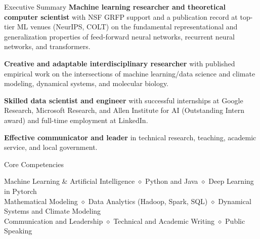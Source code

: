 \documentclass{resume} %
\begin{document}

\begin{rSection}{Executive Summary}
\textbf{Machine learning researcher and theoretical computer scientist} with NSF GRFP support and a publication record at top-tier ML venues (NeurIPS, COLT)  on the fundamental representational and generalization properties of feed-forward neural networks, recurrent neural networks, and transformers.

\textbf{Creative and adaptable interdisciplinary researcher} with published empirical work on the intersections of machine learning/data science and climate modeling, dynamical systems, and molecular biology.

\textbf{Skilled data scientist and engineer} with successful internships at Google Research, Microsoft Research, and Allen Institute for AI (Outstanding Intern award) and full-time employment at LinkedIn. 

\textbf{Effective communicator and leader} in technical research, teaching, academic service, and local government.
\end{rSection}

\begin{rSection}{Core Competencies}
\begin{center}
Machine Learning \& Artificial Intelligence 	$\diamond$ Python and Java $\diamond$ 
Deep Learning in Pytorch \\ %
Mathematical Modeling $\diamond$ Data Analytics (Hadoop, Spark, SQL) $\diamond$ 
Dynamical Systems and Climate Modeling \\ %
Communication and Leadership $\diamond$ Technical and Academic Writing $\diamond$ Public Speaking
\end{center}


\end{rSection}
\end{document}
